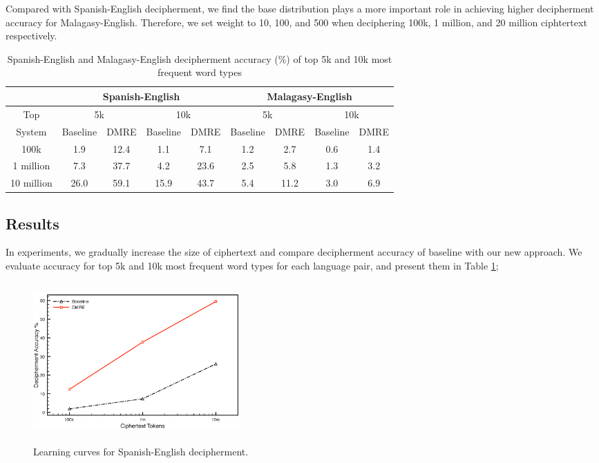 Compared with Spanish-English decipherment, we find the base distribution plays a more important role in achieving higher decipherment accuracy for Malagasy-English. Therefore, we set weight to 10, 100, and 500 when deciphering 100k, 1 million, and 20 million ciphtertext respectively.


%
 \begin{table}[!ht]
 \begin{center}
 \begin{tabular}{ |c|c|c|c|c|c|c|c|c| } \hline
         & \multicolumn{4}{|c|}{Spanish-English} & \multicolumn{4}{|c|}{Malagasy-English} \\ \hline
 Top &  \multicolumn{2}{|c|}{5k} & \multicolumn{2}{|c|}{10k} & \multicolumn{2}{|c|}{5k} & \multicolumn{2}{|c|}{10k} \\ \hline
 System &  Baseline & DMRE & Baseline & DMRE &  Baseline & DMRE & Baseline & DMRE \\ \hline
 100k &  1.9 & 12.4 & 1.1 & 7.1 &  1.2 & 2.7 & 0.6 & 1.4 \\ \hline
 1 million &  7.3 & 37.7& 4.2 & 23.6 &  2.5 & 5.8 & 1.3 & 3.2 \\ \hline
 10 million &  26.0 & 59.1 & 15.9 & 43.7 &  5.4 & 11.2 & 3.0 & 6.9 \\ \hline
 \end{tabular}
 \caption{Spanish-English and Malagasy-English decipherment accuracy (\%) of top 5k and 10k most frequent word types}
 \label{decipher-acc-result}
 \end{center}
 \end{table}
%

\subsection{Results}
In experiments, we gradually increase the size of ciphertext and compare decipherment accuracy of baseline with our new approach. We evaluate accuracy for top 5k and 10k most frequent word types for each language pair, and present them in Table \ref{decipher-acc-result}; 


 \begin{figure}[!ht]
  \centering
  \includegraphics[width=3.1in,height=2.4in]{es_en_curve}
  \caption{Learning curves for Spanish-English decipherment.}
\label{es-en-curve}
\end{figure}

